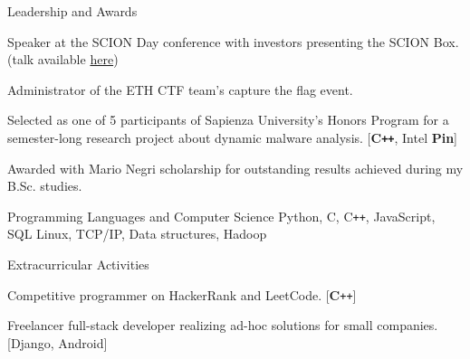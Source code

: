 \documentclass{resume}
\begin{document}
\begin{rSection}{Leadership and Awards}

\begin{rSubsection}{}{}{}{}
\item Speaker at the SCION Day conference with investors presenting the SCION Box. (talk available \href{https://video.ethz.ch/events/2019/scion/61dd8a87-3894-489d-99d3-77ca66c5ad38.html}{here})
\item Administrator of the ETH CTF team's capture the flag event.
\item Selected as one of 5 participants of Sapienza University's Honors Program for a semester-long research project about dynamic malware analysis. [\textbf{C\texttt{++}}, Intel \textbf{Pin}]
\item Awarded with Mario Negri scholarship for outstanding results achieved during my B.Sc. studies.
\end{rSubsection}

\end{rSection}


\begin{rSection}{Programming Languages and Computer Science}
Python, C, C\texttt{++}, JavaScript, SQL \hfill Linux, TCP/IP, Data structures, Hadoop
\end{rSection}


\begin{rSection}{Extracurricular Activities}

\begin{rSubsection}{}{}{}{}
\item Competitive programmer on HackerRank and LeetCode. [\textbf{C}\texttt{++}]
\item Freelancer full-stack developer realizing ad-hoc solutions for small companies. [Django, Android]
\end{rSubsection}
\end{rSection}
\end{document}

